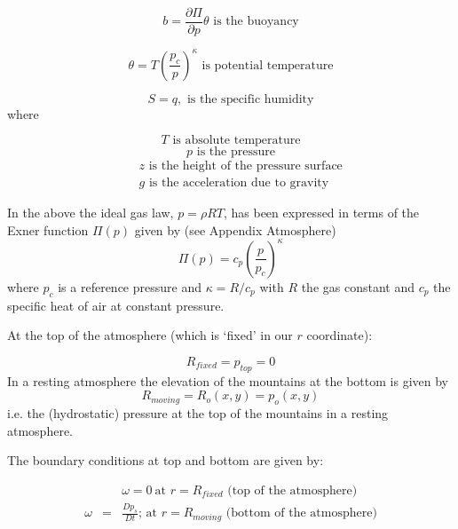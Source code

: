 \begin{equation}
b=\frac{\partial \Pi }{\partial p}\theta \text{ is the buoyancy}
\label{eq:atmos-b}
\end{equation}

\begin{equation}
\theta =T(\frac{p_{c}}{p})^{\kappa }\text{ is potential temperature}
\label{eq:atmos-theta}
\end{equation}

\begin{equation}
S=q,\text{ is the specific humidity}  \label{eq:atmos-s}
\end{equation}
where

\begin{equation*}
T\text{ is absolute temperature}
\end{equation*}
\begin{equation*}
p\text{ is the pressure}
\end{equation*}
\begin{eqnarray*}
&&z\text{ is the height of the pressure surface} \\
&&g\text{ is the acceleration due to gravity}
\end{eqnarray*}

In the above the ideal gas law, $p=\rho RT$, has been expressed in terms of
the Exner function $\Pi (p)$ given by (see Appendix Atmosphere) 
\begin{equation}
\Pi (p)=c_{p}(\frac{p}{p_{c}})^{\kappa }  \label{eq:exner}
\end{equation}
where $p_{c}$ is a reference pressure and $\kappa =R/c_{p}$ with $R$ the gas
constant and $c_{p}$ the specific heat of air at constant pressure.

At the top of the atmosphere (which is `fixed' in our $r$ coordinate):

\begin{equation*}
R_{fixed}=p_{top}=0
\end{equation*}
In a resting atmosphere the elevation of the mountains at the bottom is
given by 
\begin{equation*}
R_{moving}=R_{o}(x,y)=p_{o}(x,y)
\end{equation*}
i.e. the (hydrostatic) pressure at the top of the mountains in a resting
atmosphere.

The boundary conditions at top and bottom are given by:

\begin{eqnarray}
&&\omega =0~\text{at }r=R_{fixed} \text{ (top of the atmosphere)}
\label{eq:fixed-bc-atmos} \\
\omega &=&\frac{Dp_{s}}{Dt}\text{; at }r=R_{moving}\text{ (bottom of the
atmosphere)}  \label{eq:moving-bc-atmos}
\end{eqnarray}

